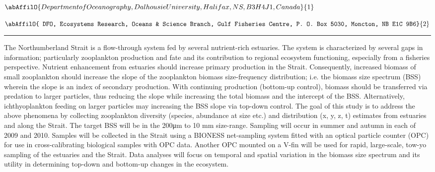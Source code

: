 \begin{minipage}{\linewidth}\begin{center}\begin{minipage}{\linewidth}
   \vspace{2 mm} \begin{center}
    \vspace{2 mm}\begin{center}
  
  $\abAffilO{Department of Oceanography, Dalhousie University, Halifax, NS, B3H 4J1, Canada}{1}$

  
  $\abAffilO{ DFO, Ecosystems Research, Oceans & Science Branch, Gulf Fisheries Centre, P. O. Box 5030, Moncton, NB E1C 9B6}{2}$

  \end{center}
  \vspace{2 mm}
  \end{center}\end{minipage}\end{center}
  \begin{center}\rule{0.70\linewidth}{0.5 pt}\end{center}
  \begin{minipage}{\linewidth}
\noindent The Northumberland Strait is a flow-through system fed by several nutrient-rich estuaries. The system is characterized by several gaps in information; particularly zooplankton production and fate and its contribution to regional ecosystem functioning, especially from a fisheries perspective. Nutrient enhancement from estuaries should increase primary production in the Strait. Consequently, increased biomass of small zooplankton should increase the slope of the zooplankton biomass size-frequency distribution; i.e. the biomass size spectrum (BSS) wherein the slope is an index of secondary production. With continuing production (bottom-up control), biomass should be transferred via predation to larger particles, thus reducing the slope while increasing the total biomass and the intercept of the BSS. Alternatively, ichthyoplankton feeding on larger particles may increasing the BSS slope via top-down control. The goal of this study is to address the above phenomena by collecting zooplankton diversity (species, abundance at size etc.) and distribution (x, y, z, t) estimates from estuaries and along the Strait. The target BSS will be in the 200μm to 10 mm size-range. Sampling will occur in summer and autumn in each of 2009 and 2010. Samples will be collected in the Strait using a BIONESS net-sampling system fitted with an optical particle counter (OPC) for use in cross-calibrating biological samples with OPC data. Another OPC mounted on a V-fin will be used for rapid, large-scale, tow-yo sampling of the estuaries and the Strait. Data analyses will focus on temporal and spatial variation in the biomass size spectrum and its utility in determining top-down and bottom-up changes in the ecosystem.
\end{minipage}\end{minipage}

